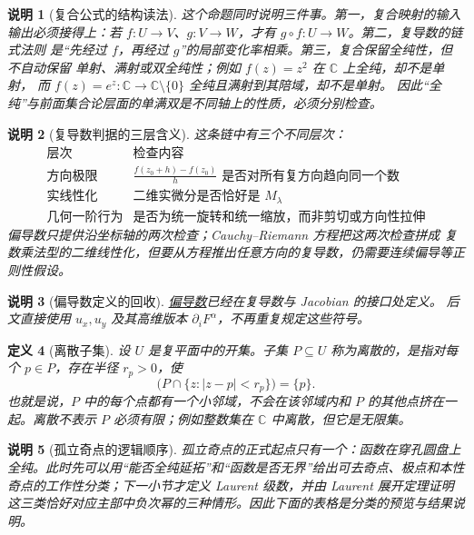 \documentclass[UTF8,fontset=none,a4paper,11pt]{ctexart}
\theoremstyle{foundation-definition}
\newtheorem{definition}{定义}[section]
\theoremstyle{foundation-theorem}
\theoremstyle{foundation-proposition}
\theoremstyle{foundation-example}
\theoremstyle{foundation-remark}
\newtheorem{remark}[definition]{说明}
\theoremstyle{foundation-theorem}
\newcommand{\term}[2]{\hyperref[#1]{#2}}
\begin{document}
\begin{remark}[复合公式的结构读法]
这个命题同时说明三件事。第一，复合映射的输入输出必须接得上：若
 $f:U\to V$、$g:V\to W$，才有 $g\circ f:U\to W$。第二，复导数的链式法则
是“先经过 $f$，再经过 $g$”的局部变化率相乘。第三，复合保留全纯性，但不自动保留
单射、满射或双全纯性；例如 $f(z)=z^2$ 在 $\mathbb C$ 上全纯，却不是单射，
而 $f(z)=e^z:\mathbb C\to\mathbb C\setminus\{0\}$ 全纯且满射到其陪域，却不是单射。
因此“全纯”与前面集合论层面的单满双是不同轴上的性质，必须分别检查。
\end{remark}

\begin{remark}[复导数判据的三层含义]\label{rem:complex-derivative-three-levels}
这条链中有三个不同层次：
\[
\begin{array}{c|c}
\text{层次}&\text{检查内容}\\
\hline
\text{方向极限}&
\displaystyle\frac{f(z_0+h)-f(z_0)}h\text{ 是否对所有复方向趋向同一个数}\\
\text{实线性化}&
\text{二维实微分是否恰好是 }M_\lambda\\
\text{几何一阶行为}&
\text{是否为统一旋转和统一缩放，而非剪切或方向性拉伸}
\end{array}
\]
偏导数只提供沿坐标轴的两次检查；Cauchy--Riemann 方程把这两次检查拼成
复数乘法型的二维线性化，但要从方程推出任意方向的复导数，仍需要连续偏导等正则性假设。
\end{remark}

\begin{remark}[偏导数定义的回收]
\term{def:partial-derivative}{偏导数}已经在复导数与 Jacobian 的接口处定义。
后文直接使用 \(u_x,u_y\) 及其高维版本 \(\partial_iF^\alpha\)，不再重复规定这些符号。
\end{remark}

\begin{definition}[离散子集]\label{def:discrete-subset}
设 \(U\) 是复平面中的开集。子集 \(P\subseteq U\) 称为离散的，是指对每个
\(p\in P\)，存在半径 \(r_p>0\)，使
\[
\bigl(P\cap\{z:|z-p|<r_p\}\bigr)=\{p\}.
\]
也就是说，\(P\) 中的每个点都有一个小邻域，不会在该邻域内和 \(P\) 的其他点挤在一起。离散不表示 \(P\) 必须有限；例如整数集在 \(\mathbb C\) 中离散，但它是无限集。\end{definition}

\begin{remark}[孤立奇点的逻辑顺序]\label{rem:isolated-singularity-order}
孤立奇点的正式起点只有一个：函数在穿孔圆盘上全纯。此时先可以用“能否全纯延拓”和“函数是否无界”给出可去奇点、极点和本性奇点的工作性分类；下一小节才定义 Laurent 级数，并由 Laurent 展开定理证明这三类恰好对应主部中负次幂的三种情形。因此下面的表格是分类的预览与结果说明。
\end{remark}
\end{document}
